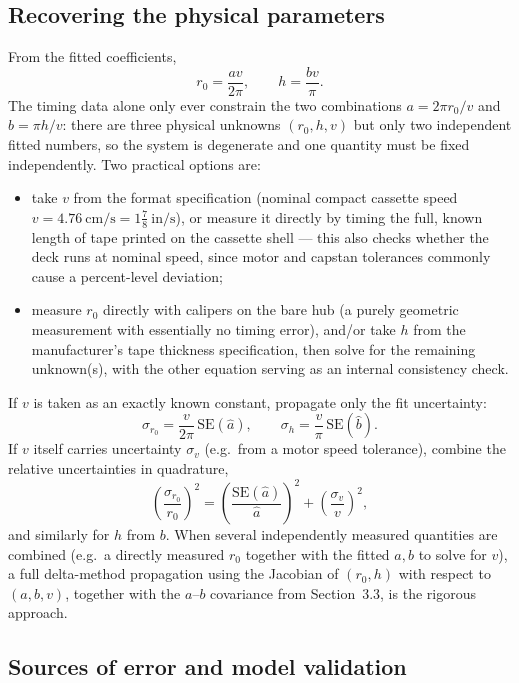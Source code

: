 \documentclass[12pt,oneside,a4paper]{article}
\newcommand{\be}{\begin{equation}}
\newcommand{\ee}{\end{equation}}
\begin{document}
\subsection{Recovering the physical parameters}

From the fitted coefficients,
\be
r_0 = \frac{av}{2\pi}, \qquad h = \frac{bv}{\pi}.
\ee
The timing data alone only ever constrain the two combinations
$a = 2\pi r_0/v$ and $b = \pi h/v$: there are three physical
unknowns $(r_0, h, v)$ but only two independent fitted numbers, so
the system is degenerate and one quantity must be fixed
independently. Two practical options are:
\begin{itemize}
\item take $v$ from the format specification (nominal compact
  cassette speed $v = 4.76\ \mathrm{cm/s} = 1\tfrac{7}{8}\
  \mathrm{in/s}$), or measure it directly by timing the full,
  known length of tape printed on the cassette shell --- this also
  checks whether the deck runs at nominal speed, since motor and
  capstan tolerances commonly cause a percent-level deviation;
\item measure $r_0$ directly with calipers on the bare hub (a
  purely geometric measurement with essentially no timing error),
  and/or take $h$ from the manufacturer's tape thickness
  specification, then solve for the remaining unknown(s), with the
  other equation serving as an internal consistency check.
\end{itemize}

If $v$ is taken as an exactly known constant, propagate only the fit
uncertainty:
\be
\sigma_{r_0} = \frac{v}{2\pi}\,\mathrm{SE}(\hat a), \qquad
\sigma_h = \frac{v}{\pi}\,\mathrm{SE}(\hat b).
\ee
If $v$ itself carries uncertainty $\sigma_v$ (e.g.\ from a motor
speed tolerance), combine the relative uncertainties in quadrature,
\be
\left(\frac{\sigma_{r_0}}{r_0}\right)^2
  = \left(\frac{\mathrm{SE}(\hat a)}{\hat a}\right)^2
  + \left(\frac{\sigma_v}{v}\right)^2,
\ee
and similarly for $h$ from $b$. When several independently measured
quantities are combined (e.g.\ a directly measured $r_0$ together
with the fitted $a,b$ to solve for $v$), a full delta-method
propagation using the Jacobian of $(r_0,h)$ with respect to
$(a,b,v)$, together with the $a$--$b$ covariance from
Section~3.3, is the rigorous approach.

\subsection{Sources of error and model validation}
\end{document}
